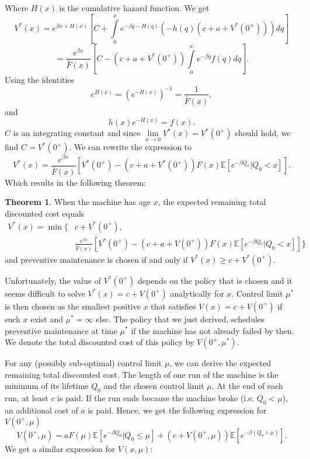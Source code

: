 \documentclass[a4paper]{thesis}
\theoremstyle{definition}
\newtheorem{theorem}{Theorem}[section]
\begin{document}
Where $H(x)$ is the cumulative hazard function.
We get
$$
V^*(x)=e^{\beta x +H(x)} [C + \int\limits_0^x e^{-\beta q -H(q)}(-h(q)(c+a+V^*(0^+)))dq]
$$
$$
=\frac{e^{\beta x}}{\bar F(x)} [C - (c+a+V^*(0^+))\int\limits_0^x e^{-\beta q}f(q)dq].
$$
Using the identities 
\[e^{H(x)}=(e^{-H(x)})^{-1}=\frac{1}{\bar F(x)},\]
and
\[h(x)e^{-H(x)}=f(x).\]
$C$ is an integrating constant and since $\lim\limits_{x\rightarrow 0}V^*(x)=V^*(0^+)$ should hold, we find $C=V^*(0^+)$.
We can rewrite the expression to
$$
V^*(x)=\frac{e^{\beta x}}{\bar F(x)} [V^*(0^+)  - (c+a+V^*(0^+))F(x)\mathbb{E}[e^{-\beta Q_0}|Q_0<x]].
$$
Which results in the following theorem:
\begin{theorem}
	When the machine has age $x$, the expected remaining total discounted cost equals
	\begin{equation}\label{eq:AgeBasedSolvedBellman}
	\begin{split}
	V^*(x)=\min\{&c+V^*(0^+),\\
	&\frac{ e^{\beta x}}{\bar F(x)} [V^*(0^+) - (c+a+V(0^+))F(x)\mathbb{E}[e^{-\beta Q_0}|Q_0<x]]
	\}
	\end{split}
	\end{equation}
	and preventive maintenance is chosen if and only if $V^*(x)\geq c+V^*(0^+)$.
\end{theorem}
Unfortunately, the value of $V^*(0^+)$ depends on the policy that is chosen and it seems difficult to solve $V^*(x)=c+V(0^+)$ analytically for $x$.
Control limit $\mu^*$ is then chosen as the smallest positive $x$ that satisfies $V(x)=c+V(0^+)$ if such $x$ exist and $\mu^*=\infty$ else.
The policy that we just derived, schedules preventive maintenance at time $\mu^*$ if the machine has not already failed by then.
We denote the total discounted cost of this policy by $V(0^+,\mu^*)$.

For any (possibly sub-optimal) control limit $\mu$, we can derive the expected remaining total discounted cost.
The length of one run of the machine is the minimum of its lifetime $Q_0$ and the chosen control limit $\mu$.
At the end of each run, at least $c$ is paid.
If the run ends because the machine broke (i.e. $Q_0<\mu$), an additional cost of $a$ is paid.
Hence, we get the following expression for $V(0^+,\mu)$
\begin{equation}\label{eq:AgeBasedPolicyTDC}
V(0^+,\mu)=aF(\mu)\mathbb{E}[e^{-\beta Q_0}|Q_0\leq \mu]+(c+V(0^+,\mu))\mathbb{E}[e^{-\beta(Q_0\wedge\mu)}].
\end{equation}
We get a similar expression for $V(x,\mu)$:
\end{document}
